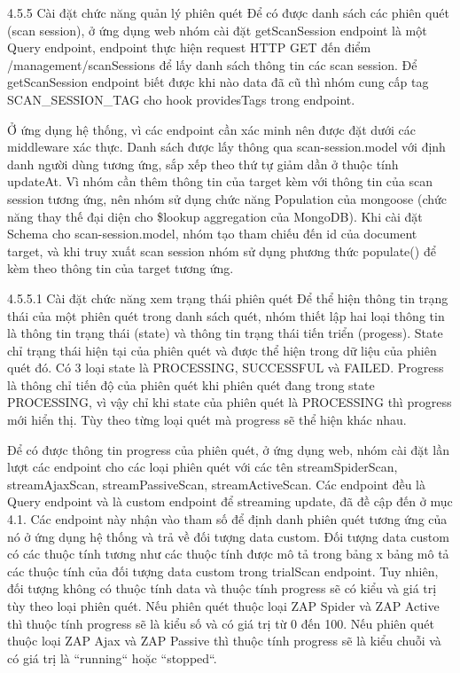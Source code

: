 4.5.5 Cài đặt chức năng quản lý phiên quét
Để có được danh sách các phiên quét (scan session), ở ứng dụng web nhóm cài đặt getScanSession endpoint là một Query endpoint, endpoint thực hiện request HTTP GET đến điểm /management/scanSessions để lấy danh sách thông tin các scan session. Để getScanSession endpoint biết được khi nào data đã cũ thì nhóm cung cấp tag SCAN\_SESSION\_TAG cho hook providesTags trong endpoint. 

Ở ứng dụng hệ thống, vì các endpoint cần xác minh nên được đặt dưới các middleware xác thực. Danh sách được lấy thông qua scan-session.model với định danh người dùng tương ứng, sắp xếp theo thứ tự giảm dần ở thuộc tính updateAt. Vì nhóm cần thêm thông tin của target kèm với thông tin của scan session tương ứng, nên nhóm sử dụng chức năng Population của mongoose (chức năng thay thế đại diện cho \$lookup aggregation của MongoDB). Khi cài đặt Schema cho scan-session.model, nhóm tạo tham chiếu đến id của document target, và khi truy xuất scan session nhóm sử dụng phương thức populate() để kèm theo thông tin của target tương ứng.

4.5.5.1 Cài đặt chức năng xem trạng thái phiên quét
Để thể hiện thông tin trạng thái của một phiên quét trong danh sách quét, nhóm thiết lập hai loại thông tin là thông tin trạng thái (state) và thông tin trạng thái tiến triển (progess). State chỉ trạng thái hiện tại của phiên quét và được thể hiện trong dữ liệu của phiên quét đó. Có 3 loại state là PROCESSING, SUCCESSFUL và FAILED. Progress là thông chỉ tiến độ của phiên quét khi phiên quét đang trong state PROCESSING, vì vậy chỉ khi state của phiên quét là PROCESSING thì progress mới hiển thị. Tùy theo từng loại quét mà progress sẽ thể hiện khác nhau.

Để có được thông tin progress của phiên quét, ở ứng dụng web, nhóm cài đặt lần lượt các endpoint cho các loại phiên quét với các tên streamSpiderScan, streamAjaxScan, streamPassiveScan, streamActiveScan. Các endpoint đều là Query endpoint và là custom endpoint để streaming update, đã đề cập đến ở mục 4.1. Các endpoint này nhận vào tham số để định danh phiên quét tương ứng của nó ở ứng dụng hệ thống và trả về đối tượng data custom. Đối tượng data custom có các thuộc tính tương như các thuộc tính được mô tả trong bảng x bảng mô tả các thuộc tính của đối tượng data custom trong trialScan endpoint. Tuy nhiên, đối tượng không có thuộc tính data và thuộc tính progress sẽ có kiểu và giá trị tùy theo loại phiên quét. Nếu phiên quét thuộc loại ZAP Spider và ZAP Active thì thuộc tính progress sẽ là kiểu số và có giá trị từ 0 đến 100. Nếu phiên quét thuộc loại ZAP Ajax và ZAP Passive thì thuộc tính progress sẽ là kiểu chuỗi và có giá trị là “running“ hoặc “stopped“. 

